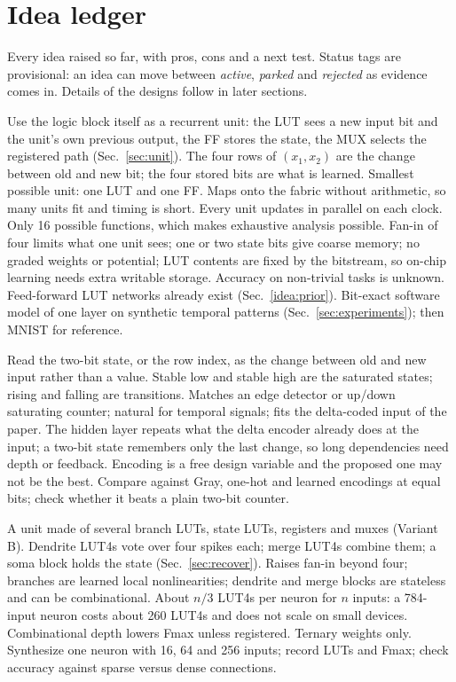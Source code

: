 \section{Idea ledger}
\label{sec:ledger}
Every idea raised so far, with pros, cons and a next test. Status tags are provisional: an idea can move between \emph{active}, \emph{parked} and \emph{rejected} as evidence comes in. Details of the designs follow in later sections.

{Use the logic block itself as a recurrent unit: the LUT sees a new input bit and the unit's own previous output, the FF stores the state, the MUX selects the registered path (Sec.~\ref{sec:unit}). The four rows of $(x_1,x_2)$ are the change between old and new bit; the four stored bits are what is learned.}
{Smallest possible unit: one LUT and one FF. Maps onto the fabric without arithmetic, so many units fit and timing is short. Every unit updates in parallel on each clock. Only 16 possible functions, which makes exhaustive analysis possible.}
{Fan-in of four limits what one unit sees; one or two state bits give coarse memory; no graded weights or potential; LUT contents are fixed by the bitstream, so on-chip learning needs extra writable storage. Accuracy on non-trivial tasks is unknown. Feed-forward LUT networks already exist (Sec.~\ref{idea:prior}).}
{Bit-exact software model of one layer on synthetic temporal patterns (Sec.~\ref{sec:experiments}); then MNIST for reference.}

{Read the two-bit state, or the row index, as the change between old and new input rather than a value. Stable low and stable high are the saturated states; rising and falling are transitions.}
{Matches an edge detector or up/down saturating counter; natural for temporal signals; fits the delta-coded input of the paper.}
{The hidden layer repeats what the delta encoder already does at the input; a two-bit state remembers only the last change, so long dependencies need depth or feedback. Encoding is a free design variable and the proposed one may not be the best.}
{Compare against Gray, one-hot and learned encodings at equal bits; check whether it beats a plain two-bit counter.}

{A unit made of several branch LUTs, state LUTs, registers and muxes (Variant B). Dendrite LUT4s vote over four spikes each; merge LUT4s combine them; a soma block holds the state (Sec.~\ref{sec:recover}).}
{Raises fan-in beyond four; branches are learned local nonlinearities; dendrite and merge blocks are stateless and can be combinational.}
{About $n/3$ LUT4s per neuron for $n$ inputs: a 784-input neuron costs about 260 LUT4s and does not scale on small devices. Combinational depth lowers Fmax unless registered. Ternary weights only.}
{Synthesize one neuron with 16, 64 and 256 inputs; record LUTs and Fmax; check accuracy against sparse versus dense connections.}

